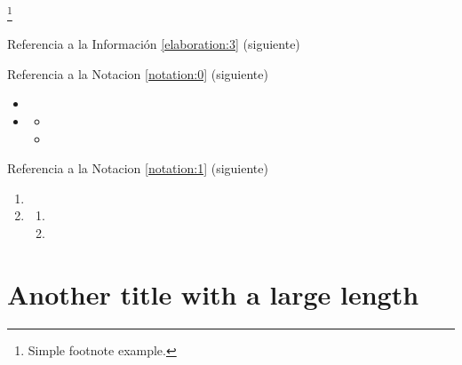 \lipsum[1] %

\begin{attentionbox}
\label{attentionbox:a}
\lipsum[1][1-3]\footnote{Simple footnote example.}
\end{attentionbox}

\lipsum[1] %

Referencia a la Información \ref{elaboration:3} (siguiente)

\begin{elaboration}[Título C]
\label{elaboration:3}
\lipsum[1][1-3] 
\end{elaboration}

\lipsum[1][1-3] %


Referencia a la Notacion \ref{notation:0} (siguiente)

\begin{notation}[Título C]
\label{notation:0}
\lipsum[1][1-2]
\begin{itemize}
\item \lipsum[1][1-2]
\item \lipsum[1][1-2]
\begin{itemize}
\item \lipsum[1][1-2]
\item \lipsum[1][1-2]
\end{itemize}
\end{itemize}
\end{notation}

\lipsum[1][1-3] %

Referencia a la Notacion \ref{notation:1} (siguiente)

\begin{notation}[Título C]
\label{notation:1}
\lipsum[1][1-2]
\begin{enumerate}
\item \lipsum[1][1-2]
\item \lipsum[1][1-2]
\begin{enumerate}
\item \lipsum[1][1-2]
\item \lipsum[1][1-2]
\end{enumerate}
\end{enumerate}
\end{notation}

\section{Another title with a large length}

